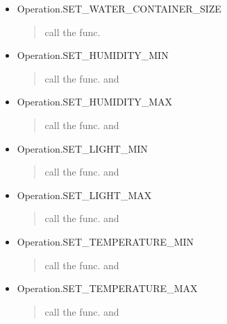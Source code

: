 \documentclass[letterpaper,10pt,english]{sphinxmanual}
\begin{document}
\begin{fulllineitems}
\begin{itemize}
\item {} 
Operation.SET\_WATER\_CONTAINER\_SIZE
\begin{quote}

call the func. 
\end{quote}

\item {} 
Operation.SET\_HUMIDITY\_MIN
\begin{quote}

call the func.  and 
\end{quote}

\item {} 
Operation.SET\_HUMIDITY\_MAX
\begin{quote}

call the func.  and 
\end{quote}

\item {} 
Operation.SET\_LIGHT\_MIN
\begin{quote}

call the func.  and 
\end{quote}

\item {} 
Operation.SET\_LIGHT\_MAX
\begin{quote}

call the func.  and 
\end{quote}

\item {} 
Operation.SET\_TEMPERATURE\_MIN
\begin{quote}

call the func.  and 
\end{quote}

\item {} 
Operation.SET\_TEMPERATURE\_MAX
\begin{quote}

call the func.  and 
\end{quote}


\end{itemize}
\end{fulllineitems}
\end{document}
